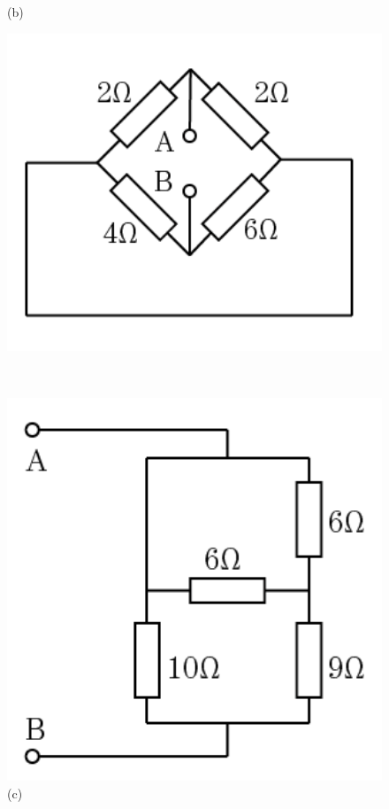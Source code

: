\documentclass[hyperref, UTF8]{ctexart}
\begin{document}
\begin{figure}[!htb]
\begin{minipage}[t]{0.184\textwidth}
    \caption*{(b)}
  \end{minipage}
  \begin{minipage}[t]{0.208\textwidth}
    \centering
    \includegraphics[width=1\textwidth]{p2-1-c.png}
    \caption*{(c)}
  \end{minipage} \\
  \centering
  \begin{minipage}[t]{0.195\textwidth}
    \centering
    \includegraphics[width=1\textwidth]{p2-1-d.png}

\end{minipage}
\end{figure}
\end{document}
